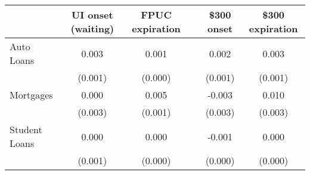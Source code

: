 \begin{table}[ht]
\centering
\begin{tabular}{lccccc}
   \toprule \toprule & UI onset (waiting) & FPUC expiration && \$300 onset & \$300 expiration\\ \midrule    Auto Loans & 0.003 & 0.001 &  &  0.002 & 0.003 \\ 
   & (0.001) & (0.000) &  & (0.001) & (0.001) \\ 
  Mortgages & 0.000 & 0.005 &  & -0.003 & 0.010 \\ 
   & (0.003) & (0.001) &  & (0.003) & (0.003) \\ 
  Student Loans & 0.000 & 0.000 &  & -0.001 & 0.000 \\ 
   & (0.001) & (0.000) &  & (0.000) & (0.000) \\ 
   \bottomrule\end{tabular}
\end{table}
